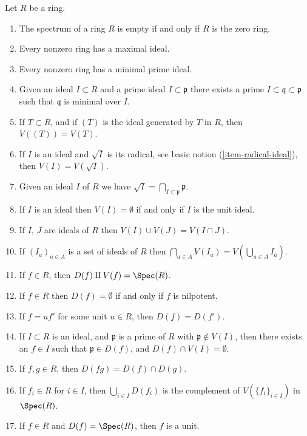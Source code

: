 \begin{lemma}
\label{lemma-Zariski-topology}
Let $R$ be a ring.
\begin{enumerate}
\item The spectrum of a ring $R$ is empty if and only if $R$
is the zero ring.
\item Every nonzero ring has a maximal ideal.
\item Every nonzero ring has a minimal prime ideal.
\item Given an ideal $I \subset R$ and a prime ideal
$I \subset \mathfrak p$ there exists a prime
$I \subset \mathfrak q \subset \mathfrak p$ such
that $\mathfrak q$ is minimal over $I$.
\item If $T \subset R$, and if $(T)$ is the ideal generated by
$T$ in $R$, then $V((T)) = V(T)$.
\item If $I$ is an ideal and $\sqrt{I}$ is its radical,
see basic notion (\ref{item-radical-ideal}), then $V(I) = V(\sqrt{I})$.
\item Given an ideal $I$ of $R$ we have $\sqrt{I} =
\bigcap_{I \subset \mathfrak p} \mathfrak p$.
\item If $I$ is an ideal then $V(I) = \emptyset$ if and only
if $I$ is the unit ideal.
\item If $I$, $J$ are ideals of $R$ then $V(I) \cup V(J) =
V(I \cap J)$.
\item If $(I_a)_{a\in A}$ is a set of ideals of $R$ then
$\bigcap_{a\in A} V(I_a) = V(\bigcup_{a\in A} I_a)$.
\item If $f \in R$, then $D(f) \amalg V(f) = \Spec(R)$.
\item If $f \in R$ then $D(f) = \emptyset$ if and only if $f$
is nilpotent.
\item If $f = u f'$ for some unit $u \in R$, then $D(f) = D(f')$.
\item If $I \subset R$ is an ideal, and $\mathfrak p$ is a prime of
$R$ with $\mathfrak p \not\in V(I)$, then there exists an $f \in I$
such that $\mathfrak p \in D(f)$, and $D(f) \cap V(I) = \emptyset$.
\item If $f, g \in R$, then $D(fg) = D(f) \cap D(g)$.
\item If $f_i \in R$ for $i \in I$, then
$\bigcup_{i\in I} D(f_i)$ is the complement of $V(\{f_i \}_{i\in I})$
in $\Spec(R)$.
\item If $f \in R$ and $D(f) = \Spec(R)$, then $f$ is a unit.
\end{enumerate}
\end{lemma}

